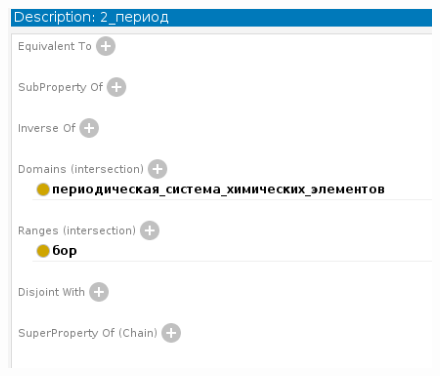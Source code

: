 \documentclass[a4paper]{article}
\begin{document}
\begin{landscape}
\begin{figure}
\begin{tabular}{cc}
  \end{tabular} 
  \end{figure}
  \begin{figure}[t]
  \end{figure}  
  \begin{figure}
  \centering
  \includegraphics[scale=1.0]{./Source/protege/2_per.png}
  \end{figure}
  \begin{figure}[t]

\end{figure}
\end{landscape}
\end{document}
